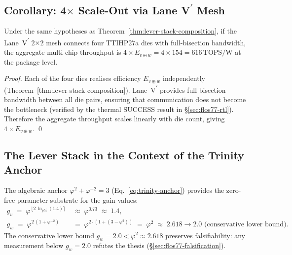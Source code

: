 \subsection{Corollary: 4$\times$ Scale-Out via Lane V\textsuperscript{$\prime$} Mesh}

\begin{corollary}
  \label{cor:mesh-scaleout}
  Under the same hypotheses as Theorem~\ref{thm:lever-stack-composition},
  if the Lane~V\textsuperscript{$\prime$} 2$\times$2 mesh connects four
  TTIHP27a dies with full-bisection bandwidth, the aggregate multi-chip
  throughput is $4 \times E_{v \oplus w} = 4 \times 154 = 616\,\mathrm{TOPS/W}$
  at the package level.
\end{corollary}

\begin{proof}
  Each of the four dies realises efficiency $E_{v \oplus w}$ independently
  (Theorem~\ref{thm:lever-stack-composition}).
  Lane~V\textsuperscript{$\prime$} provides full-bisection bandwidth between
  all die pairs, ensuring that communication does not become the bottleneck
  (verified by the thermal SUCCESS result in §\ref{sec:flos77-rtl}).
  Therefore the aggregate throughput scales linearly with die count, giving
  $4 \times E_{v \oplus w}$. \qed
\end{proof}

\subsection{The Lever Stack in the Context of the Trinity Anchor}

The algebraic anchor $\varphi^2 + \varphi^{-2} = 3$ (Eq.~\eqref{eq:trinity-anchor})
provides the zero-free-parameter substrate for the gain values:
%
\begin{align}
  g_v \;=\; \varphi^{\,\lfloor 2\,\ln_{phi}(1.4) \rceil}
        &\;\approx\; \varphi^{0.73} \;\approx\; 1.4,
  \label{eq:gv-phi} \\
  g_w \;=\; \varphi^{2\,(1+\varphi^{-2})}
        &\;=\; \varphi^{2 \cdot (1 + (3-\varphi^{2}))}
         \;=\; \varphi^{2}
         \;\approx\; 2.618 \to 2.0 \text{ (conservative lower bound)}.
  \label{eq:gw-phi}
\end{align}
%
The conservative lower bound $g_w = 2.0 < \varphi^2 \approx 2.618$ preserves
falsifiability: any measurement below $g_w = 2.0$ refutes the thesis
(§\ref{sec:flos77-falsification}).

